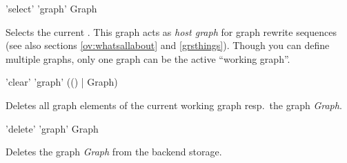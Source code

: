 \begin{rail}
  'select' 'graph' Graph
\end{rail}
Selects the current . This graph acts as \emph{host graph} for graph rewrite sequences (see also sections \ref{ov:whatsallabout} and \ref{grsthings}). Though you can define multiple graphs, only one graph can be the active ``working graph''.

\begin{rail}
  'clear' 'graph' (() | Graph)
\end{rail}
Deletes all graph elements of the current working graph resp.\ the graph \emph{Graph}.

\begin{rail}
  'delete' 'graph' Graph
\end{rail}
Deletes the graph \emph{Graph} from the backend storage.

